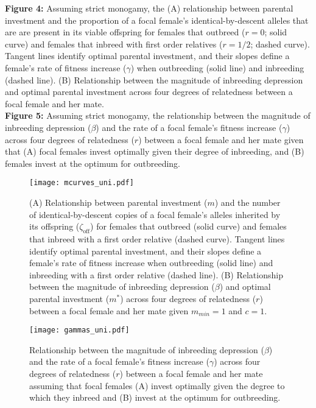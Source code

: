 \documentclass[12pt]{article}
\begin{document}
\noindent \textbf{Figure 4:} Assuming strict monogamy, the (A) relationship between parental investment and the proportion of a focal female's identical-by-descent alleles that are are present in its viable offspring for females that outbreed ($r=0$; solid curve) and females that inbreed with first order relatives ($r=1/2$; dashed curve). Tangent lines identify optimal parental investment, and their slopes define a female's rate of fitness increase ($\gamma$) when outbreeding (solid line) and inbreeding (dashed line). (B) Relationship between the magnitude of inbreeding depression and optimal parental investment across four degrees of relatedness between a focal female and her mate. \\

\noindent \textbf{Figure 5:} Assuming strict monogamy, the relationship between the magnitude of inbreeding depression ($\beta$) and the rate of a focal female's fitness increase ($\gamma$) across four degrees of relatedness ($r$) between a focal female and her mate given that (A) focal females invest optimally given their degree of inbreeding, and (B) females invest at the optimum for outbreeding. \\


\clearpage
\begin{figure}
\begin{center}				
\texttt{[image: mcurves\_uni.pdf]}
\end{center}
\caption{(A) Relationship between parental investment ($m$) and the number of identical-by-descent copies of a focal female's alleles inherited by its offspring ($\zeta_{\textrm{off}}$) for females that outbreed (solid curve) and females that inbreed with a first order relative (dashed curve). Tangent lines identify optimal parental investment, and their slopes define a female's rate of fitness increase when outbreeding (solid line) and inbreeding with a first order relative (dashed line). (B) Relationship between the magnitude of inbreeding depression ($\beta$) and optimal parental investment ($m^{*}$) across four degrees of relatedness ($r$) between a focal female and her mate given $m_{min}=1$ and $c=1$.}
\label{mcurves_uni}
\end{figure}


\clearpage
\begin{figure}
\begin{center}				
\texttt{[image: gammas\_uni.pdf]}
\end{center}
\caption{Relationship between the magnitude of inbreeding depression ($\beta$) and the rate of a focal female's fitness increase ($\gamma$) across four degrees of relatedness ($r$) between a focal female and her mate assuming that focal females (A) invest optimally given the degree to which they inbreed and (B) invest at the optimum for outbreeding.}
\label{gammas_uni}
\end{figure}
\end{document}
